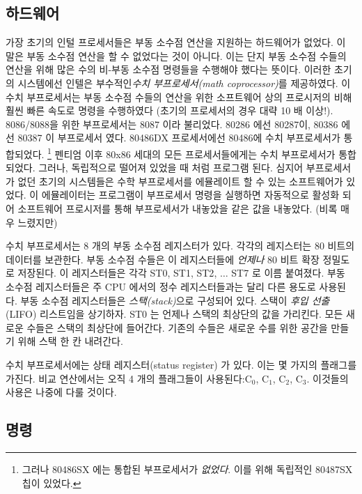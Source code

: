 \subsection{하드웨어}
가장 초기의 인털 프로세서들은 부동 소수점 연산을 지원하는 하드웨어가 없었다.
이 말은 부동 소수점 연산을 할 수 없었다는 것이 아니다. 이는 단지 부동 소수점 수들의
연산을 위해 많은 수의 비-부동 소수점 명령들을 수행해야 했다는 뜻이다. 이러한
초기의 시스템에선 인텔은 부수적인\emph{수치 부프로세서(math coprocessor)}를 제공하였다.
이 수치 부프로세서는 부동 소수점 수들의 연산을 위한 소프트웨어 상의 프로시저의 비해
훨씬 빠른 속도로 명령을 수행하였다 (초기의 프로세서의 경우 대략 10 배 이상!). 8086/8088을
위한 부프로세서는 8087 이라 불리었다. 80286 에선 80287이, 80386 에선 80387 이 부프로세서 였다. 
80486DX 프로세서에선 80486에 수치 부프로세서가 통합되었다. 
\footnote{그러나 80486SX 에는 통합된 부프로세서가 \emph{없었다}. 이를 위해 독립적인 80487SX
칩이 있었다.} 펜티엄 이후 80x86 세대의 모든 프로세서들에게는 수치 부프로세서가 통합되었다. 그러나, 
독립적으로 떨어져 있었을 때 처럼 프로그램 된다. 심지어 부프로세서가 없던 초기의 시스템들은 
수학 부프로세서를 에뮬레이트 할 수 있는 소프트웨어가 있었다. 이 에뮬레이터는 프로그램이
부프로세서 명령을 실행하면 자동적으로 활성화 되어 소프트웨어 프로시저를 통해 부프로세서가 
내놓았을 같은 값을 내놓았다. (비록 매우 느렸지만)

수치 부프로세서는 8 개의 부동 소수점 레지스터가 있다. 각각의 레지스터는 80 비트의 데이터를 보관한다.
부동 소수점 수들은 이 레지스터들에 \emph{언제나} 80 비트 확장 정밀도로 저장된다. 이 레지스터들은 각각
{\code ST0}, {\code ST1}, {\code ST2}, $\ldots$ {\code ST7} 로 이름 붙여졌다. 부동 소수점 레지스터들은
주  CPU 에서의 정수 레지스터들과는 달리 다른 용도로 사용된다. 부동 소수점 레지스터들은
\emph{스택(stack)}으로 구성되어 있다. 스택이 \emph{후입 선출} (LIFO) 리스트임을
상기하자. {\code ST0} 는 언제나 스택의 최상단의 값을 가리킨다. 모든 새로운 수들은 스택의 최상단에 들어간다.
기존의 수들은 새로운 수를 위한 공간을 만들기 위해 스택 한 칸 내려간다. 

수치 부프로세서에는 상태 레지스터(status register) 가 있다. 이는 몇 가지의 플래그를 가진다.
비교 연산에서는 오직 4 개의 플래그들이 사용된다:C$_0$, C$_1$, C$_2$, C$_3$. 이것들의
사용은 나중에 다룰 것이다. 


\subsection{명령}

